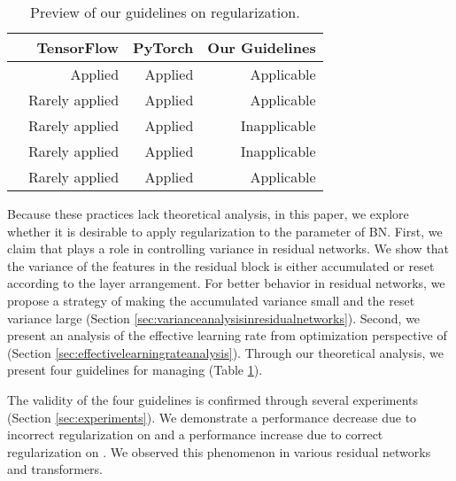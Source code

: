 \documentclass{article}
\newcommand{\cmark}{\ding{51}}\newcommand{\xmark}{\ding{55}}
\begin{document}
\begin{table}[h]
	\caption{Preview of our guidelines on  regularization.}
	\label{tab:guideline}
	\centering
	\begin{tabular}{l|r|r|r}
		\toprule
		                  & \textbf{TensorFlow}                  & \textbf{PyTorch}                 & \textbf{Our Guidelines}               \\
		\midrule
		               & Applied        \textcolor{blue}{\cmark} & Applied \textcolor{blue}{\cmark} & Applicable \textcolor{blue}{\cmark}  \\
		   & Rarely applied \textcolor{red}{\xmark}  & Applied \textcolor{blue}{\cmark} & Applicable \textcolor{blue}{\cmark}  \\
		   & Rarely applied \textcolor{red}{\xmark}  & Applied \textcolor{blue}{\cmark} & Inapplicable \textcolor{red}{\xmark} \\
		      & Rarely applied \textcolor{red}{\xmark}  & Applied \textcolor{blue}{\cmark} & Inapplicable \textcolor{red}{\xmark} \\
		 & Rarely applied \textcolor{red}{\xmark}  & Applied \textcolor{blue}{\cmark} & Applicable \textcolor{blue}{\cmark}  \\
		\bottomrule
	\end{tabular}
\end{table}

Because these practices lack theoretical analysis, in this paper, we explore whether it is desirable to apply  regularization to the  parameter of BN. First, we claim that  plays a role in controlling variance in residual networks. We show that the variance of the features in the residual block is either accumulated or reset according to the layer arrangement. For better behavior in residual networks, we propose a strategy of making the accumulated variance small and the reset variance large (Section \ref{sec:varianceanalysisinresidualnetworks}). Second, we present an analysis of the effective learning rate from optimization perspective of  (Section \ref{sec:effectivelearningrateanalysis}). Through our theoretical analysis, we present four guidelines for managing  (Table \ref{tab:guideline}).

The validity of the four guidelines is confirmed through several experiments (Section \ref{sec:experiments}). We demonstrate a performance decrease due to incorrect  regularization on  and a performance increase due to correct  regularization on . We observed this phenomenon in various residual networks and transformers.
\end{document}
